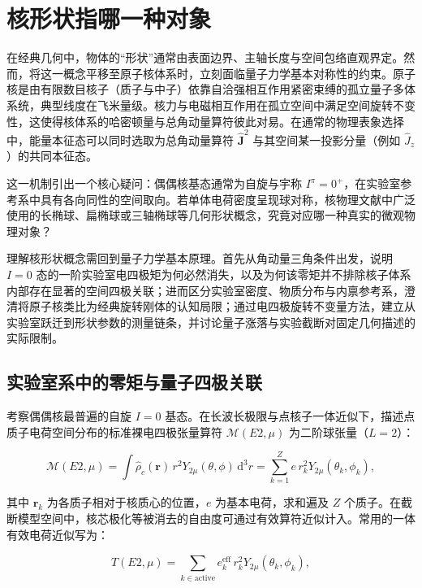 \section{核形状指哪一种对象}\label{sec:1-2}

在经典几何中，物体的“形状”通常由表面边界、主轴长度与空间包络直观界定。然而，将这一概念平移至原子核体系时，立刻面临量子力学基本对称性的约束。原子核是由有限数目核子（质子与中子）依靠自洽强相互作用紧密束缚的孤立量子多体系统，典型线度在飞米量级。核力与电磁相互作用在孤立空间中满足空间旋转不变性，这使得核体系的哈密顿量与总角动量算符彼此对易。在通常的物理表象选择中，能量本征态可以同时选取为总角动量算符 $\hat{\mathbf{J}}^2$ 与其空间某一投影分量（例如 $\hat{J}_z$）的共同本征态。

这一机制引出一个核心疑问：偶偶核基态通常为自旋与宇称 $I^\pi = 0^+$，在实验室参考系中具有各向同性的空间取向。若单体电荷密度呈现球对称，核物理文献中广泛使用的长椭球、扁椭球或三轴椭球等几何形状概念，究竟对应哪一种真实的微观物理对象？

理解核形状概念需回到量子力学基本原理。首先从角动量三角条件出发，说明 $I=0$ 态的一阶实验室电四极矩为何必然消失，以及为何该零矩并不排除核子体系内部存在显著的空间四极关联；进而区分实验室密度、物质分布与内禀参考系，澄清将原子核类比为经典旋转刚体的认知局限；通过电四极旋转不变量方法，建立从实验室跃迁到形状参数的测量链条，并讨论量子涨落与实验截断对固定几何描述的实际限制。

\subsection{实验室系中的零矩与量子四极关联}\label{sec:1-2-1}

考察偶偶核最普遍的自旋 $I = 0$ 基态。在长波长极限与点核子一体近似下，描述点质子电荷空间分布的标准裸电四极张量算符 $\mathcal{M}(E2, \mu)$ 为二阶球张量（$L = 2$）：

\begin{equation}\label{eq:1-2-1}
\mathcal{M}(E2, \mu) = \int \hat{\rho}_c(\mathbf{r}) \, r^2 Y_{2\mu}(\theta, \phi) \, \mathrm{d}^3r = \sum_{k=1}^Z e \, r_k^2 Y_{2\mu}(\theta_k, \phi_k),
\end{equation}

其中 $\mathbf{r}_k$ 为各质子相对于核质心的位置，$e$ 为基本电荷，求和遍及 $Z$ 个质子。在截断模型空间中，核芯极化等被消去的自由度可通过有效算符近似计入。常用的一体有效电荷近似写为：

\begin{equation}\label{eq:1-2-2}
\hat{T}(E2, \mu) = \sum_{k\in\mathrm{active}} e_k^{\text{eff}} \, r_k^2 Y_{2\mu}(\theta_k, \phi_k),
\end{equation}

